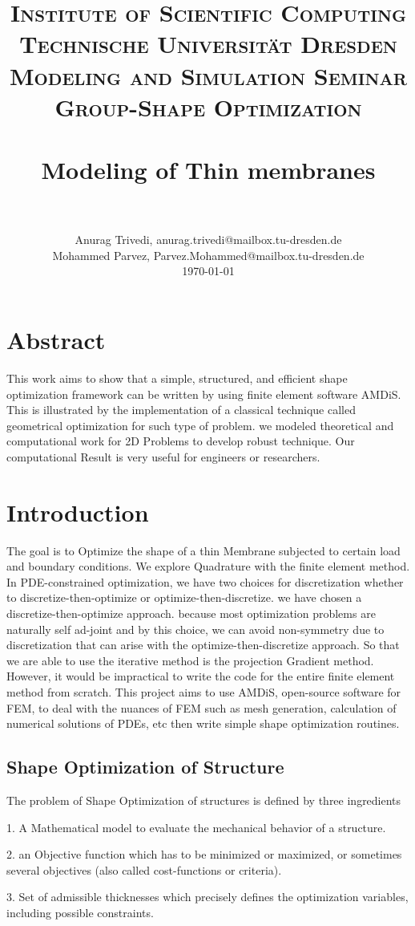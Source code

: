 \documentclass[paper=a4, fontsize=11pt]{scrartcl}
\title{
		\usefont{OT1}{bch}{b}{n}
		\normalfont \normalsize \textsc{Institute of Scientific Computing\\Technische Universität Dresden\\
		Modeling and Simulation Seminar \\
		Group-Shape Optimization} \\ [25pt]
		\horrule{0.5pt} \\[0.4cm]
		\huge Modeling of Thin membranes \\ 
		\horrule{2pt} \\[0.5cm]
}
\author{
		\normalfont 								\normalsize
        Anurag Trivedi, anurag.trivedi@mailbox.tu-dresden.de \\[-3pt] \normalsize
        Mohammed Parvez, Parvez.Mohammed@mailbox.tu-dresden.de\\[-3pt]		\normalsize
        \today
}
\date{}
\numberwithin{equation}{section}		%
\numberwithin{figure}{section}			%
\numberwithin{table}{section}				%
\begin{document}
\vspace{5mm}

\maketitle
\section{Abstract}

This work aims to show that a simple, structured, and efficient shape optimization framework can be written by using finite element software AMDiS. This is illustrated by the implementation of a classical technique called geometrical optimization for such type of problem. we modeled theoretical and computational work for 2D Problems to develop robust technique. Our computational Result is very useful for engineers or researchers.
\section{Introduction}
The goal is to Optimize the shape of a thin Membrane subjected to certain load and boundary conditions. We explore Quadrature with the finite element method. In PDE-constrained optimization, we have two choices for discretization whether to discretize-then-optimize or optimize-then-discretize. we have chosen a discretize-then-optimize approach. because most optimization problems are naturally self ad-joint and by this choice, we can avoid non-symmetry due to discretization that can arise with the optimize-then-discretize approach. So that we are able to use the iterative method is the projection Gradient method. However, it would be impractical to write the code for the entire finite element method from scratch. This project aims to use AMDiS, open-source software for FEM, to deal with the nuances of FEM such as mesh generation, calculation of numerical solutions of PDEs, etc then write simple shape optimization routines.

\subsection{Shape Optimization of Structure}

The problem of Shape Optimization of structures is defined by three ingredients
\begin{description} 
 \item
1. A Mathematical model to evaluate the mechanical behavior of a structure.
 \item
2. an Objective function which has to be minimized or maximized, or sometimes several objectives (also called cost-functions or criteria).
 \item
3. Set of admissible thicknesses which precisely defines the optimization variables, including possible constraints.


\end{description}
\end{document}
